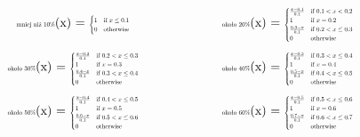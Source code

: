 \documentclass{article}
\begin{document}
\[
\begin{minipage}{0.5\textwidth}
\centering
\text{\scalebox{0.5}{mniej niż 10\%}}(x) = \scalebox{0.5}{$
\begin{cases} 
1 & \text{if } x \leq 0.1 \\
0 & \text{otherwise}
\end{cases}
$}
\end{minipage}%
\begin{minipage}{0.5\textwidth}
\centering
\text{\scalebox{0.5}{około 20\%}}(x) = \scalebox{0.5}{$
\begin{cases} 
\frac{x - 0.1}{0.1} & \text{if } 0.1 < x < 0.2 \\
1 & \text{if } x = 0.2 \\
\frac{0.3 - x}{0.1} & \text{if } 0.2 < x \leq 0.3 \\
0 & \text{otherwise}
\end{cases}
$}
\end{minipage}
\]
\[
\begin{minipage}{0.5\textwidth}
\centering
\text{\scalebox{0.5}{około 30\%}}(x) = \scalebox{0.5}{$
\begin{cases} 
\frac{x - 0.2}{0.1} & \text{if } 0.2 < x \leq 0.3 \\
1 & \text{if } x = 0.3 \\
\frac{0.4 - x}{0.1} & \text{if } 0.3 < x \leq 0.4 \\
0 & \text{otherwise}
\end{cases}
$}
\end{minipage}%
\begin{minipage}{0.5\textwidth}
\centering
\text{\scalebox{0.5}{około 40\%}}(x) = \scalebox{0.5}{$
\begin{cases} 
\frac{x - 0.3}{0.1} & \text{if } 0.3 < x \leq 0.4 \\
1 & \text{if } x = 0.4 \\
\frac{0.5 - x}{0.1} & \text{if } 0.4 < x \leq 0.5 \\
0 & \text{otherwise}
\end{cases}
$}
\end{minipage}
\]
\[
\begin{minipage}{0.5\textwidth}
\centering
\text{\scalebox{0.5}{około 50\%}}(x) = \scalebox{0.5}{$
\begin{cases} 
\frac{x - 0.4}{0.1} & \text{if } 0.4 < x \leq 0.5 \\
1 & \text{if } x = 0.5 \\
\frac{0.6 - x}{0.1} & \text{if } 0.5 < x \leq 0.6 \\
0 & \text{otherwise}
\end{cases}
$}
\end{minipage}%
\begin{minipage}{0.5\textwidth}
\centering
\text{\scalebox{0.5}{około 60\%}}(x) = \scalebox{0.5}{$
\begin{cases} 
\frac{x - 0.5}{0.1} & \text{if } 0.5 < x \leq 0.6 \\
1 & \text{if } x = 0.6 \\
\frac{0.7 - x}{0.1} & \text{if } 0.6 < x \leq 0.7 \\
0 & \text{otherwise}
\end{cases}
$}
\end{minipage}
\]
\end{document}
